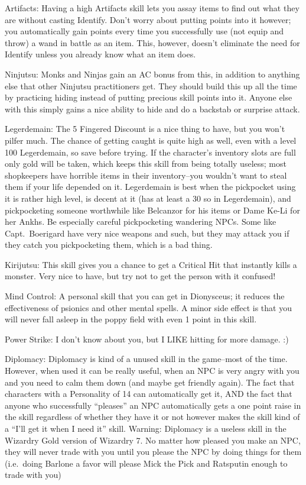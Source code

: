 \documentclass[12pt]{article}
\begin{document}
Artifacts: Having a high Artifacts skill lets you assay items to find
out what they are without casting Identify. Don't worry about putting
points into it however; you automatically gain points every time you
successfully use (not equip and throw) a wand in battle as an item.
This, however, doesn't eliminate the need for Identify unless you
already know what an item does.

Ninjutsu: Monks and Ninjas gain an AC bonus from this, in addition to
anything else that other Ninjutsu practitioners get. They should build
this up all the time by practicing hiding instead of putting precious
skill points into it. Anyone else with this simply gains a nice ability
to hide and do a backstab or surprise attack.

Legerdemain: The 5 Fingered Discount is a nice thing to have, but you
won't pilfer much. The chance of getting caught is quite high as well,
even with a level 100 Legerdemain, so save before trying. If the
character's inventory slots are full only gold will be taken, which
keeps this skill from being totally useless; most shopkeepers have
horrible items in their inventory--you wouldn't want to steal them if
your life depended on it. Legerdemain is best when the pickpocket using
it is rather high level, is decent at it (has at least a 30 so in
Legerdemain), and pickpocketing someone worthwhile like Belcanzor for
his items or Dame Ke-Li for her Ankhs. Be especially careful
pickpocketing wandering NPCs. Some like Capt.~Boerigard have very nice
weapons and such, but they may attack you if they catch you
pickpocketing them, which is a bad thing.

Kirijutsu: This skill gives you a chance to get a Critical Hit that
instantly kills a monster. Very nice to have, but try not to get the
person with it confused!

Mind Control: A personal skill that you can get in Dionysceus; it
reduces the effectiveness of psionics and other mental spells. A minor
side effect is that you will never fall asleep in the poppy field with
even 1 point in this skill.

Power Strike: I don't know about you, but I LIKE hitting for more
damage. :)

Diplomacy: Diplomacy is kind of a unused skill in the game--most of the
time. However, when used it can be really useful, when an NPC is very
angry with you and you need to calm them down (and maybe get friendly
again). The fact that characters with a Personality of 14 can
automatically get it, AND the fact that anyone who successfully
``pleases'' an NPC automatically gets a one point raise in the skill
regardless of whether they have it or not however makes the skill kind
of a ``I'll get it when I need it'' skill. Warning: Diplomacy is a
useless skill in the Wizardry Gold version of Wizardry 7. No matter how
pleased you make an NPC, they will never trade with you until you please
the NPC by doing things for them (i.e.~doing Barlone a favor will please
Mick the Pick and Ratsputin enough to trade with you)
\end{document}
